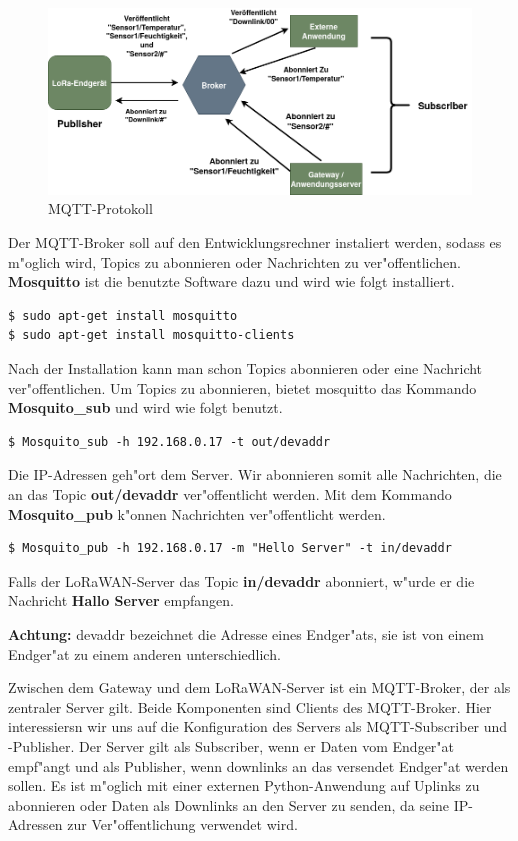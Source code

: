 \begin{figure}[h]
	\centering
	\includegraphics[width=13cm]{source/images/MQTT}
	\caption{MQTT-Protokoll\label{fig:mqtt}}
\end{figure}

Der MQTT-Broker soll auf den Entwicklungsrechner instaliert werden, sodass es m"oglich wird, Topics zu abonnieren oder Nachrichten zu ver"offentlichen. \textbf{Mosquitto} ist die benutzte Software dazu und wird wie folgt installiert.
 
\begin{lstlisting}[frame=single]
$ sudo apt-get install mosquitto
$ sudo apt-get install mosquitto-clients
\end{lstlisting}
Nach der Installation kann man schon Topics abonnieren oder eine Nachricht ver"offentlichen. Um Topics zu 
abonnieren, bietet mosquitto das Kommando \textbf{Mosquito\_sub} und wird wie folgt benutzt.

\begin{lstlisting}[frame=single]
$ Mosquito_sub -h 192.168.0.17 -t out/devaddr
\end{lstlisting}
Die IP-Adressen geh"ort dem Server. Wir abonnieren somit alle Nachrichten, die an das Topic
\textbf{out/devaddr} ver"offentlicht werden. Mit dem Kommando \textbf{Mosquito\_pub} k"onnen Nachrichten ver"offentlicht werden.

\begin{lstlisting}[frame=single]
$ Mosquito_pub -h 192.168.0.17 -m "Hello Server" -t in/devaddr
\end{lstlisting}
Falls der LoRaWAN-Server das Topic \textbf{in/devaddr} abonniert, w"urde er die Nachricht 
\textbf{Hallo Server} empfangen.

\textbf{Achtung:} devaddr bezeichnet die Adresse eines Endger"ats, sie ist von einem Endger"at zu einem anderen unterschiedlich.

Zwischen dem Gateway und dem LoRaWAN-Server ist ein MQTT-Broker, der als zentraler Server 
gilt. Beide Komponenten sind Clients des MQTT-Broker. Hier interessiersn wir uns auf die 
Konfiguration des Servers als MQTT-Subscriber und -Publisher. Der Server gilt als 
Subscriber, wenn er Daten vom Endger"at empf"angt und als Publisher, wenn downlinks an das 
versendet Endger"at werden sollen. Es ist m"oglich mit einer externen Python-Anwendung auf 
Uplinks zu abonnieren  oder Daten als Downlinks an den Server zu senden, da seine IP-Adressen zur Ver"offentlichung verwendet wird.
 
